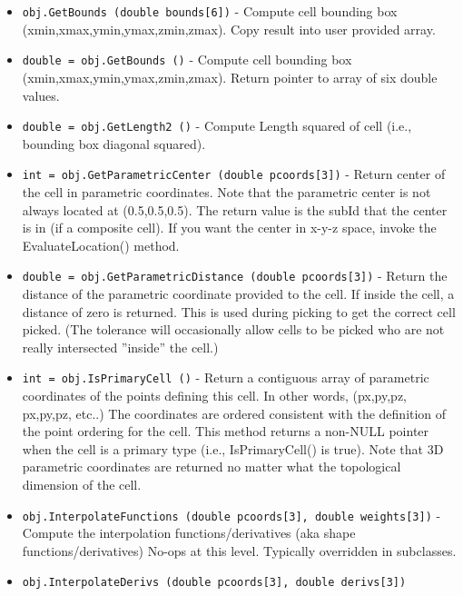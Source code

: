 \begin{itemize}
\item  \verb|obj.GetBounds (double bounds[6])| -  Compute cell bounding box (xmin,xmax,ymin,ymax,zmin,zmax). Copy result
 into user provided array.

\item  \verb|double = obj.GetBounds ()| -  Compute cell bounding box (xmin,xmax,ymin,ymax,zmin,zmax). Return pointer
 to array of six double values.

\item  \verb|double = obj.GetLength2 ()| -  Compute Length squared of cell (i.e., bounding box diagonal squared).

\item  \verb|int = obj.GetParametricCenter (double pcoords[3])| -  Return center of the cell in parametric coordinates.  Note that the
 parametric center is not always located at (0.5,0.5,0.5). The return
 value is the subId that the center is in (if a composite cell). If you
 want the center in x-y-z space, invoke the EvaluateLocation() method.

\item  \verb|double = obj.GetParametricDistance (double pcoords[3])| -  Return the distance of the parametric coordinate provided to the
 cell. If inside the cell, a distance of zero is returned. This is
 used during picking to get the correct cell picked. (The tolerance
 will occasionally allow cells to be picked who are not really
 intersected ''inside'' the cell.)

\item  \verb|int = obj.IsPrimaryCell ()| -  Return a contiguous array of parametric coordinates of the points
 defining this cell. In other words, (px,py,pz, px,py,pz, etc..)  The
 coordinates are ordered consistent with the definition of the point
 ordering for the cell. This method returns a non-NULL pointer when
 the cell is a primary type (i.e., IsPrimaryCell() is true). Note that
 3D parametric coordinates are returned no matter what the topological
 dimension of the cell.

\item  \verb|obj.InterpolateFunctions (double pcoords[3], double weights[3])| -  Compute the interpolation functions/derivatives
 (aka shape functions/derivatives)
 No-ops at this level. Typically overridden in subclasses.

\item  \verb|obj.InterpolateDerivs (double pcoords[3], double derivs[3])|

\end{itemize}
